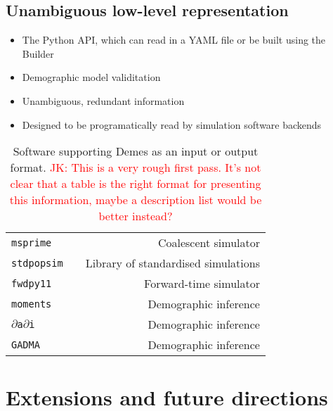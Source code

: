 \documentclass[11pt]{article}
\newenvironment{code}{\captionsetup{type=listing}\centering}{}
\newcommand{\msprime}[0]{\texttt{msprime}}
\newcommand{\stdpopsim}[0]{\texttt{stdpopsim}}
\newcommand{\moments}[0]{\texttt{moments}}
\newcommand{\dadi}[0]{\texttt{$\partial$a$\partial$i}}
\newcommand{\fwdpy}[0]{\texttt{fwdpy11}}
\newcommand{\gadma}[0]{\texttt{GADMA}}
\newcommand{\jkcomment}[1]{{\textcolor{red}{JK: #1}}}
\begin{document}
\begin{code}
\begin{tcolorbox}
\inputminted[linenos,numbersep=5pt]{yaml}{models/IM.yaml}
\end{tcolorbox}
\label{code:im_model}
\end{code}

\subsection*{Unambiguous low-level representation}

\begin{itemize}
    \item The Python API, which can read in a YAML file or be built using the
        Builder
    \item Demographic model validitation
    \item Unambiguous, redundant information
    \item Designed to be programatically read by simulation software backends
\end{itemize}


\begin{table}
\begin{center}
\begin{tabular}{llr}
\msprime & \citep{kelleher2016efficient} & Coalescent simulator \\
\stdpopsim & \citep{adrion2020community} & Library of standardised simulations \\
\fwdpy & \citep{thornton2014c++} & Forward-time simulator \\
\moments & \citep{jouganous2017inferring,ragsdale2019models}
    & Demographic inference \\
\dadi & \citep{gutenkunst2009inferring}  & Demographic inference \\
\gadma & \citep{noskova2020gadma}  & Demographic inference \\
\end{tabular}
\end{center}
\caption{Software supporting Demes as an input or output format.
\jkcomment{This is a very rough first pass. It's not clear that a table is the
right format for presenting this information, maybe a description
list would be better instead?}}
\end{table}

\section*{Extensions and future directions}
\end{document}
